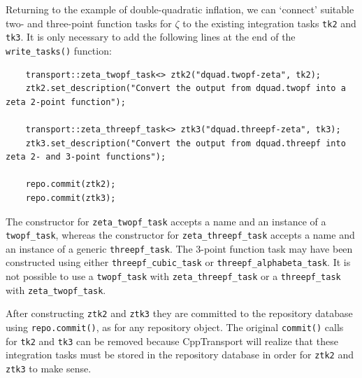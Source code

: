 \documentclass[11pt,a4paper]{article}
\newcommand{\packagefont}{\sffamily}
\newcommand{\CppTransport}{{\packagefont CppTransport}}
\begin{document}
Returning to the example of double-quadratic inflation,
we can `connect' suitable two- and three-point function
tasks for $\zeta$ to the existing integration tasks
\texttt{tk2} and
\texttt{tk3}.
It is only necessary to add the following lines at the end of
the
\texttt{write_tasks()} function:
\begin{verbatim}
    transport::zeta_twopf_task<> ztk2("dquad.twopf-zeta", tk2);
    ztk2.set_description("Convert the output from dquad.twopf into a zeta 2-point function");

    transport::zeta_threepf_task<> ztk3("dquad.threepf-zeta", tk3);
    ztk3.set_description("Convert the output from dquad.threepf into zeta 2- and 3-point functions");

    repo.commit(ztk2);
    repo.commit(ztk3);    
\end{verbatim}
The constructor for
\texttt{zeta_twopf_task} accepts a name and an instance of a
\texttt{twopf_task}, whereas
the constructor for
\texttt{zeta_threepf_task} accepts a name and an instance of
a generic
\texttt{threepf_task}.
The 3-point function task may
have been constructed using either
\texttt{threepf_cubic_task} or
\texttt{threepf_alphabeta_task}.
It is not possible to use
a \texttt{twopf_task} with
\texttt{zeta_threepf_task}
or a \texttt{threepf_task} with
\texttt{zeta_twopf_task}.

After constructing
\texttt{ztk2} and
\texttt{ztk3}
they are committed to the
repository
database using \texttt{repo.commit()},
as for any repository object.
The original
\texttt{commit()}
calls for
\texttt{tk2} and
\texttt{tk3} can be removed because
{\CppTransport} will realize that
these integration tasks must be stored in the
repository database in order for
\texttt{ztk2} and
\texttt{ztk3} to make sense.
\end{document}
